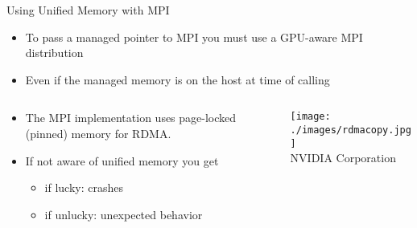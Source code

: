 \documentclass[aspectratio=43]{beamer}
\begin{document}
\begin{frame}[fragile]{Using Unified Memory with MPI}
    \begin{itemize}
        \item To pass a managed pointer to MPI you must use a GPU-aware MPI distribution
        \item Even if the managed memory is on the host at time of calling
    \end{itemize}

    \begin{columns}[T]
        \begin{column}{0.5\textwidth}
            \begin{itemize}
                \item The MPI implementation uses page-locked (pinned) memory for RDMA.
                \item If not aware of unified memory you get
                \begin{itemize}
                    \item if lucky: crashes
                    \item if unlucky: unexpected behavior
                \end{itemize}
            \end{itemize}
        \end{column}

        \begin{column}{0.5\textwidth}
            \texttt{[image: ./images/rdmacopy.jpg]}\\
            \footnotesize \textcopyright NVIDIA Corporation
        \end{column}
    \end{columns}
\end{frame}
\end{document}
